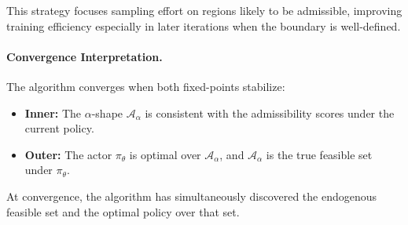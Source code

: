 This strategy focuses sampling effort on regions likely to be admissible, improving training efficiency especially in later iterations when the boundary is well-defined.

\paragraph{Convergence Interpretation.}
The algorithm converges when both fixed-points stabilize:
\begin{itemize}
    \item \textbf{Inner:} The $\alpha$-shape $\mathcal{A}_\alpha$ is consistent with the admissibility scores under the current policy.
    \item \textbf{Outer:} The actor $\pi_\theta$ is optimal over $\mathcal{A}_\alpha$, and $\mathcal{A}_\alpha$ is the true feasible set under $\pi_\theta$.
\end{itemize}
At convergence, the algorithm has simultaneously discovered the endogenous feasible set and the optimal policy over that set.
